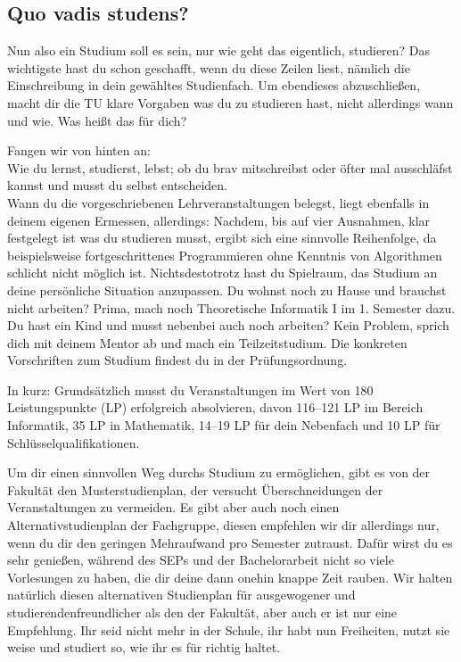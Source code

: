 \begin{multicols}{2}
\subsection{Quo vadis studens?}

Nun also ein Studium soll es sein, nur wie geht das eigentlich, studieren? Das wichtigste hast du schon geschafft, wenn du diese Zeilen liest, nämlich die Einschreibung in dein gewähltes Studienfach. Um ebendieses abzuschließen, macht dir die TU klare Vorgaben was du zu studieren hast, nicht allerdings wann und wie. Was heißt das für dich?

Fangen wir von hinten an:\\
Wie du lernst, studierst, lebst; ob du brav mitschreibst oder öfter mal ausschläfst kannst und musst du selbst entscheiden. \\
Wann du die vorgeschriebenen Lehrveranstaltungen belegst, liegt ebenfalls in deinem eigenen Ermessen, allerdings: Nachdem, bis auf vier Ausnahmen, klar festgelegt ist was du studieren musst, ergibt sich eine sinnvolle Reihenfolge, da beispielsweise fortgeschrittenes Programmieren ohne Kenntnis von Algorithmen schlicht nicht möglich ist. Nichtsdestotrotz hast du Spielraum, das Studium an deine persönliche Situation anzupassen.
Du wohnst noch zu Hause und brauchst nicht arbeiten? Prima, mach noch Theoretische Informatik I im 1. Semester dazu. Du hast ein Kind und musst nebenbei auch noch arbeiten? Kein Problem, sprich dich mit deinem Mentor ab und mach ein Teilzeitstudium. Die konkreten Vorschriften zum Studium findest du in der Prüfungsordnung.

In kurz: Grundsätzlich musst du Veranstaltungen im Wert von 180 Leistungspunkte (LP) erfolgreich absolvieren, davon 116–121 LP im Bereich Informatik, 35 LP in Mathematik, 14–19 LP für dein Nebenfach und 10 LP für Schlüsselqualifikationen.

Um dir einen sinnvollen Weg durchs Studium zu ermöglichen, gibt es von der Fakultät den Musterstudienplan, der versucht Überschneidungen der Veranstaltungen zu vermeiden. Es gibt aber auch noch einen Alternativstudienplan der Fachgruppe, diesen empfehlen wir dir allerdings nur, wenn du dir den geringen Mehraufwand pro Semester zutraust. Dafür wirst du es sehr genießen, während des SEPs und der Bachelorarbeit nicht so viele Vorlesungen zu haben, die dir deine dann onehin knappe Zeit rauben. Wir halten natürlich diesen alternativen Studienplan für ausgewogener und studierendenfreundlicher als den der Fakultät, aber auch er ist nur eine Empfehlung.
Ihr seid nicht mehr in der Schule, ihr habt nun Freiheiten, nutzt sie weise und studiert so, wie ihr es für richtig haltet.
\end{multicols}